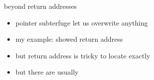 \begin{frame}{beyond return addresses}
    \begin{itemize}
    \item pointer subterfuge let us overwrite anything
    \item my example: showed return address
    \item but return address is tricky to locate exactly
    \item but there are usually 
    \end{itemize}
\end{frame}
